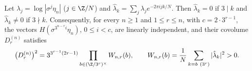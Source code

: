 Let $\lambda_j=\log|\sigma^j\eta_n|$ ($j\in\Z/N$) and $\hat\lambda_k=\sum_j\lambda_j e^{-2\pi ijk/N}$. Then $\hat\lambda_k=0$ if $3\mid k$ and $\hat\lambda_k\ne0$ if $3\nmid k$. Consequently, for every $n\ge1$ and $1\le r\le n$, with $c=2\cdot3^{r-1}$, the vectors $H(\sigma^{3^{n-r}i}\eta_n)$, $0\le i<c$, are linearly independent, and their covolume $D_r^{(n)}$ satisfies
\[ \big(D_r^{(n)}\big)^2=3^{3^{r-1}(2r-1)}\prod_{b\in(\Z/3^r)^\times}W_{n,r}(b),\qquad W_{n,r}(b)=\frac1N\sum_{k\equiv b\ (3^r)}|\hat\lambda_k|^2>0 . \]

